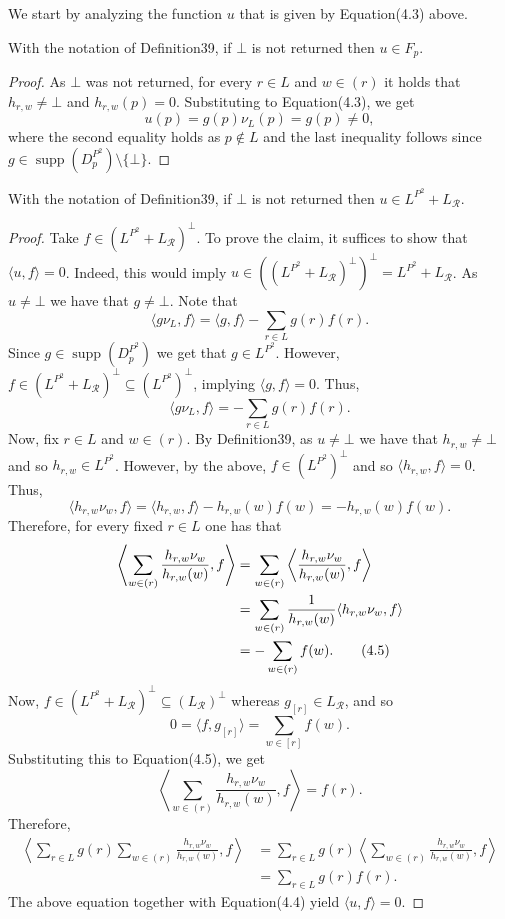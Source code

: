 We start by analyzing the function $u$ that is given by Equation(4.3) above.
\begin{ntclaim}
With the notation of Definition39, if $\bot$ is not returned then $u\in F_p$.
\end{ntclaim}
\begin{proof}
As $\bot$ was not returned, for every $r\in L$ and $w\in(r)$ it holds that $h_{r,w}\ne\bot$ and $h_{r,w}(p)=0$. Substituting to Equation(4.3), we get
\[u(p)=g(p)\nu_L(p)=g(p)\ne0,\]
where the second equality holds as $p\notin L$ and the last inequality follows since $g\in\operatorname{supp}(D_p^{P^2})\setminus\{\bot\}$.
\end{proof}
\begin{ntclaim}
With the notation of Definition39, if $\bot$ is not returned then $u\in L^{P^2}+L_{\mathcal R}$.
\end{ntclaim}
\begin{proof}
Take $f\in(L^{P^2}+L_{\mathcal R})^\perp$. To prove the claim, it suffices to show that $\langle u,f\rangle=0$. Indeed, this would imply $u\in((L^{P^2}+L_{\mathcal R})^\perp)^\perp=L^{P^2}+L_{\mathcal R}$. As $u\ne\bot$ we have that $g\ne\bot$. Note that
\[\langle g\nu_L,f\rangle=\langle g,f\rangle-\sum_{r\in L}g(r)f(r).\]
Since $g\in\operatorname{supp}(D_p^{P^2})$ we get that $g\in L^{P^2}$. However, $f\in(L^{P^2}+L_{\mathcal R})^\perp\subseteq(L^{P^2})^\perp$, implying $\langle g,f\rangle=0$. Thus,
\begin{equation}\langle g\nu_L,f\rangle=-\sum_{r\in L}g(r)f(r).\tag{4.4}\end{equation}
Now, fix $r\in L$ and $w\in(r)$. By Definition39, as $u\ne\bot$ we have that $h_{r,w}\ne\bot$ and so $h_{r,w}\in L^{P^2}$. However, by the above, $f\in(L^{P^2})^\perp$ and so $\langle h_{r,w},f\rangle=0$. Thus,
\[\langle h_{r,w}\nu_w,f\rangle=\langle h_{r,w},f\rangle-h_{r,w}(w)f(w)=-h_{r,w}(w)f(w).\]
Therefore, for every fixed $r\in L$ one has that
\begin{align}\left\langle\sum_{w\in(r)}\frac{h_{r,w}\nu_w}{h_{r,w}(w)},f\right\rangle&=\sum_{w\in(r)}\left\langle\frac{h_{r,w}\nu_w}{h_{r,w}(w)},f\right\rangle\notag\\&=\sum_{w\in(r)}\frac1{h_{r,w}(w)}\langle h_{r,w}\nu_w,f\rangle\notag\\&=-\sum_{w\in(r)}f(w).\tag{4.5}\end{align}
Now, $f\in(L^{P^2}+L_{\mathcal R})^\perp\subseteq(L_{\mathcal R})^\perp$ whereas $g_{[r]}\in L_{\mathcal R}$, and so
\[0=\langle f,g_{[r]}\rangle=\sum_{w\in[r]}f(w).\]
Substituting this to Equation(4.5), we get
\[\left\langle\sum_{w\in(r)}\frac{h_{r,w}\nu_w}{h_{r,w}(w)},f\right\rangle=f(r).\]
Therefore,
\begin{align*}\left\langle\sum_{r\in L}g(r)\sum_{w\in(r)}\frac{h_{r,w}\nu_w}{h_{r,w}(w)},f\right\rangle&=\sum_{r\in L}g(r)\left\langle\sum_{w\in(r)}\frac{h_{r,w}\nu_w}{h_{r,w}(w)},f\right\rangle\\&=\sum_{r\in L}g(r)f(r).\end{align*}
The above equation together with Equation(4.4) yield $\langle u,f\rangle=0$.
\end{proof}
